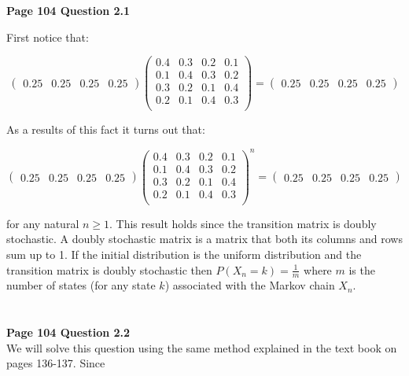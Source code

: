 \documentclass[10pt,a4paper]{article}
\begin{document}
\begin{flushleft}


\textbf{Page 104 Question 2.1}

First notice that:

\[ \left( \begin{array}{cccc} 0.25 & 0.25 & 0.25 & 0.25
\end{array} \right)
 \left( \begin{array}{cccc}
0.4 & 0.3 & 0.2 & 0.1  \\
0.1 & 0.4 & 0.3 & 0.2  \\
0.3 & 0.2 & 0.1 & 0.4  \\
0.2 & 0.1 & 0.4 & 0.3  \\
\end{array} \right) =
 \left( \begin{array}{cccc} 0.25 & 0.25 & 0.25 & 0.25
\end{array} \right)\]

As a results of this fact it turns out that:

\[ \left( \begin{array}{cccc} 0.25 & 0.25 & 0.25 & 0.25
\end{array} \right)
 \left( \begin{array}{cccc}
0.4 & 0.3 & 0.2 & 0.1  \\
0.1 & 0.4 & 0.3 & 0.2  \\
0.3 & 0.2 & 0.1 & 0.4  \\
0.2 & 0.1 & 0.4 & 0.3  \\
\end{array} \right)^n =
 \left( \begin{array}{cccc} 0.25 & 0.25 & 0.25 & 0.25
 \end{array} \right)\]

for any natural $n\geq1$. This result holds since the transition
matrix is doubly stochastic. A doubly stochastic matrix is a
matrix that both its columns and rows sum up to 1. If the initial
distribution is the uniform distribution and the transition matrix
is  doubly stochastic then $P(X_n=k)=\frac{1}{m}$ where $m$ is the
number of states (for any state $k$) associated with the Markov
chain $X_n$.

\begin{eqnarray*}
\\
\end{eqnarray*}

\textbf{Page 104 Question 2.2}\\

We will solve this question using the same method explained in the
text book on pages 136-137. Since


\end{flushleft}
\end{document}

